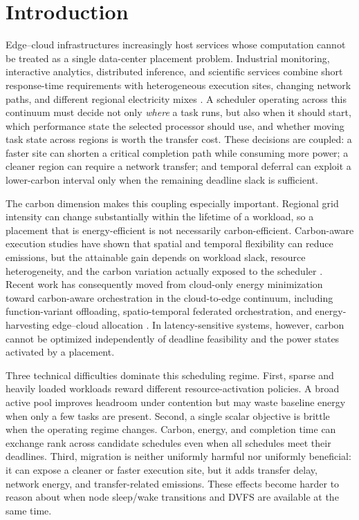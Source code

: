 \section{Introduction}
\label{sec:introduction}

Edge--cloud infrastructures increasingly host services whose computation cannot be treated as a single data-center placement problem. Industrial monitoring, interactive analytics, distributed inference, and scientific services combine short response-time requirements with heterogeneous execution sites, changing network paths, and different regional electricity mixes \cite{rahmani2025optimizing,pournazari2025computation,Etheredge2026Pulse}. A scheduler operating across this continuum must decide not only \emph{where} a task runs, but also when it should start, which performance state the selected processor should use, and whether moving task state across regions is worth the transfer cost. These decisions are coupled: a faster site can shorten a critical completion path while consuming more power; a cleaner region can require a network transfer; and temporal deferral can exploit a lower-carbon interval only when the remaining deadline slack is sufficient.

The carbon dimension makes this coupling especially important. Regional grid intensity can change substantially within the lifetime of a workload, so a placement that is energy-efficient is not necessarily carbon-efficient. Carbon-aware execution studies have shown that spatial and temporal flexibility can reduce emissions, but the attainable gain depends on workload slack, resource heterogeneity, and the carbon variation actually exposed to the scheduler \cite{West2026CarbonAwareWorkflows,son2025greenscale,zhai2025forecast}. Recent work has consequently moved from cloud-only energy minimization toward carbon-aware orchestration in the cloud-to-edge continuum, including function-variant offloading, spatio-temporal federated orchestration, and energy-harvesting edge--cloud allocation \cite{calavaro2026functionvariants,alshammaa2026federated,fu2026ehcarbon}. In latency-sensitive systems, however, carbon cannot be optimized independently of deadline feasibility and the power states activated by a placement.

Three technical difficulties dominate this scheduling regime. First, sparse and heavily loaded workloads reward different resource-activation policies. A broad active pool improves headroom under contention but may waste baseline energy when only a few tasks are present. Second, a single scalar objective is brittle when the operating regime changes. Carbon, energy, and completion time can exchange rank across candidate schedules even when all schedules meet their deadlines. Third, migration is neither uniformly harmful nor uniformly beneficial: it can expose a cleaner or faster execution site, but it adds transfer delay, network energy, and transfer-related emissions. These effects become harder to reason about when node sleep/wake transitions and DVFS are available at the same time.

